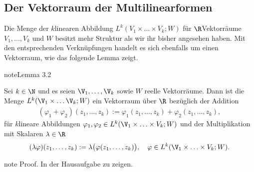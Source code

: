\documentclass[letterpaper,10pt,english]{jupyterBook}
\begin{document}
\subsection{Der Vektorraum der Multilinearformen}
\label{\detokenize{vektoranalysis/multilinear:der-vektorraum-der-multilinearformen}}
\sphinxAtStartPar
Die Menge der \(k\)\sphinxhyphen{}linearen Abbildung \(L^k(V_1 \times \ldots \times V_k; W)\) für \(\R\)\sphinxhyphen{}Vektorräume \(V_1,\ldots,V_k\) und \(W\) besitzt mehr Struktur als wir ihr bisher angesehen haben.
Mit den entsprechenden Verknüpfungen handelt es sich ebenfalls um einen Vektorraum, wie das folgende Lemma zeigt.
\label{vektoranalysis/multilinear:lemma-9}
\begin{sphinxadmonition}{note}{Lemma 3.2}



\sphinxAtStartPar
Sei \(k \in \N\) und es seien \(\V_1,\ldots,\V_k\) sowie \(W\) reelle Vektorräume.
Dann ist die Menge \(L^k(\V_1\times\ldots\V_k; W)\) ein Vektorraum über \(\R\) bezüglich der Addition
\begin{equation*}
\begin{split}(\varphi_1+\varphi_2)(z_1,\ldots,z_k) := \varphi_1(z_1,\ldots,z_k) +
\varphi_2(z_1,\ldots,z_k),\end{split}
\end{equation*}
\sphinxAtStartPar
für \(k\)\sphinxhyphen{}lineare Abbildungen \(\varphi_1,\varphi_2\in L^k(\V_1 \times \ldots \times V_k;W)\) und der Multiplikation mit Skalaren \(\lambda \in \R\)
\begin{equation*}
\begin{split}(\lambda\varphi)(z_1,\ldots,z_k) := \lambda\big(\varphi(z_1,\ldots,z_k)\big),\quad\varphi\in L^k(\V_1 \times \ldots \times V_k;W).\end{split}
\end{equation*}\end{sphinxadmonition}

\begin{sphinxadmonition}{note}
\sphinxAtStartPar
Proof. In der Hausaufgabe zu zeigen.
\end{sphinxadmonition}
\end{document}
